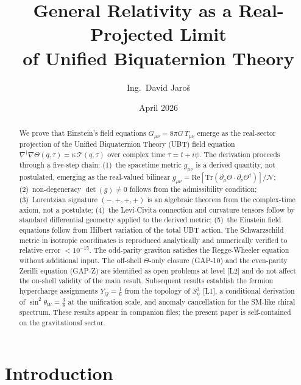 \documentclass[12pt,a4paper]{article}
\title{\textbf{General Relativity as a Real-Projected Limit\\
       of Unified Biquaternion Theory}}
\author{Ing.\ David Jaroš}
\date{April 2026}
\theoremstyle{definition}
\theoremstyle{remark}
\newcommand{\Tr}{\mathrm{Tr}}
\newcommand{\re}{\mathrm{Re}}
\newcommand{\calN}{\mathcal{N}}
\begin{document}
\maketitle

\begin{abstract}
We prove that Einstein's field equations $G_{\mu\nu} = 8\pi G\,T_{\mu\nu}$
emerge as the real-sector projection of the Unified Biquaternion Theory (UBT)
field equation
$\nabla^\dagger\nabla\Theta(q,\tau) = \kappa\,\mathcal{T}(q,\tau)$
over complex time $\tau = t + i\psi$.
The derivation proceeds through a five-step chain:
(1)~the spacetime metric $g_{\mu\nu}$ is a derived quantity, not postulated,
emerging as the real-valued bilinear
$g_{\mu\nu} = \re[\Tr(\partial_\mu\Theta \cdot \partial_\nu\Theta^\dagger)]/\calN$;
(2)~non-degeneracy $\det(g) \neq 0$ follows from the admissibility condition;
(3)~Lorentzian signature $(-,+,+,+)$ is an algebraic theorem from the
complex-time axiom, not a postulate;
(4)~the Levi-Civita connection and curvature tensors follow by standard
differential geometry applied to the derived metric;
(5)~the Einstein field equations follow from Hilbert variation of the total
UBT action.
The Schwarzschild metric in isotropic coordinates is reproduced analytically
and numerically verified to relative error $< 10^{-15}$.
The odd-parity graviton satisfies the Regge-Wheeler equation without
additional input.
The off-shell $\Theta$-only closure (GAP-10) and the even-parity Zerilli
equation (GAP-Z) are identified as open problems at level [L2] and do not
affect the on-shell validity of the main result.
Subsequent results establish the fermion hypercharge assignments
$Y_Q=\frac{1}{6}$ from the topology of $S^1_\psi$ [L1], a conditional
derivation of $\sin^2\theta_W=\frac{3}{8}$ at the unification scale,
and anomaly cancellation for the SM-like chiral spectrum.
These results appear in companion files; the present paper is
self-contained on the gravitational sector.
\end{abstract}

\tableofcontents
\bigskip\bigskip

\section{Introduction}
\label{sec:intro}
\end{document}
